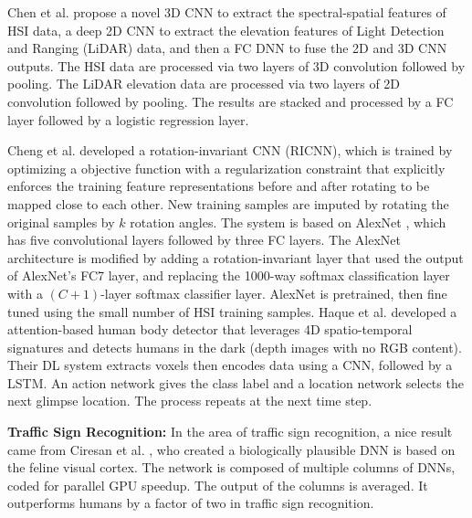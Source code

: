 \documentclass[12pt]{spieman}
\begin{document}
\begin{spacing}{1}
Chen et al. \cite{Chen2016DeepFusion} propose a novel 3D CNN to extract the spectral-spatial features of HSI data, a deep 2D CNN to extract the elevation features of Light Detection and Ranging (LiDAR) data, and then a FC DNN to fuse the 2D and 3D CNN outputs. The HSI data are processed via two layers of 3D convolution followed by pooling. The LiDAR elevation data are processed via two layers of 2D convolution followed by pooling. The results are stacked and processed by a FC layer followed by a logistic regression layer. 

Cheng et al. \cite{Cheng2016Learning} developed a rotation-invariant CNN (RICNN), which is trained by optimizing a objective function with a regularization constraint that explicitly enforces the training feature representations before and after rotating to be mapped close to each other. New training samples are imputed by rotating the original samples by $k$ rotation angles. The system is based on AlexNet \cite{krizhevsky2012imagenet}, which has five convolutional layers followed by three FC layers. The AlexNet architecture is modified by adding a rotation-invariant layer that used the output of AlexNet's FC7 layer, and replacing the 1000-way softmax classification layer with a $(C+1)$-layer softmax classifier layer. AlexNet is pretrained, then fine tuned using the small number of HSI training samples. Haque et al. \cite{Haque2016} developed a attention-based human body detector that leverages 4D spatio-temporal signatures and detects humans in the dark (depth images with no RGB content). Their DL system extracts voxels then encodes data using a CNN, followed by a LSTM. An action network gives the class label and a location network selects the next glimpse location. The process repeats at the next time step.

\textbf{Traffic Sign Recognition:} In the area of traffic sign recognition, a nice result came from Ciresan et al. \cite{Ciresan2012} , who created a biologically plausible DNN is based on the feline visual cortex. The network is composed of multiple columns of DNNs, coded for parallel GPU speedup. The output of the columns is averaged. It outperforms humans by a factor of two in traffic sign recognition.


\end{spacing}
\end{document}
